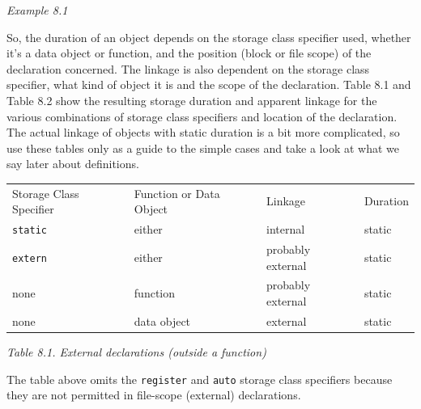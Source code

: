 \begin{center}\textit{Example 8.1}\end{center}


    So, the duration of an object depends on the storage class specifier
     used, whether it's a data object or function, and the position (block
     or file scope) of the declaration concerned. The linkage is also
     dependent on the storage class specifier, what kind of object it is and
     the scope of the declaration. Table 8.1 and Table 8.2 show the resulting storage duration and apparent linkage
     for the various combinations of storage class specifiers and location
     of the declaration. The actual linkage of objects with static duration
     is a bit more complicated, so use these tables only as a guide to the
     simple cases and take a look at what we say later about
     definitions.


    \begin{tabular}{lllp{\textwidth}}
      Storage Class Specifier & Function or Data Object & Linkage & Duration
     \\

      \texttt{static} & either & internal & static
     \\

      \texttt{extern} & either & probably external & static
     \\

      none & function & probably external & static
     \\

      none & data object & external & static
     \\
\end{tabular}

\begin{center}\textit{Table 8.1. External declarations (outside a function)}\end{center}


    The table above omits the \texttt{register} and \texttt{auto}
     storage class specifiers because they are not permitted in file-scope
     (external) declarations.


